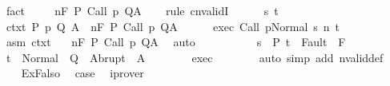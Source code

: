 \begin{isabellebody}
\ fact\isanewline
\ \ \isamarkupfalse%
\ {\isachardoublequoteopen}{\isasymGamma}{\isacharcomma}{\isasymTheta}\ {\isasymTurnstile}n{\isacharcolon}\isactrlbsub {\isacharslash}F\isactrlesub \ P\ {\isacharparenleft}Call\ p{\isacharparenright}\ Q{\isacharcomma}A{\isachardoublequoteclose}\isanewline
\ \ \isamarkupfalse%
\ {\isacharparenleft}rule\ cnvalidI{\isacharparenright}\isanewline
\ \ \ \ \isamarkupfalse%
\ s\ t\isanewline
\ \ \ \ \isamarkupfalse%
\ ctxt{\isacharcolon}\ {\isachardoublequoteopen}{\isasymforall}{\isacharparenleft}P{\isacharcomma}\ p{\isacharcomma}\ Q{\isacharcomma}\ A{\isacharparenright}{\isasymin}{\isasymTheta}{\isachardot}\ {\isasymGamma}\ {\isasymTurnstile}n{\isacharcolon}\isactrlbsub {\isacharslash}F\isactrlesub \ P\ {\isacharparenleft}Call\ p{\isacharparenright}\ Q{\isacharcomma}A{\isachardoublequoteclose}\isanewline
\ \ \ \ \isamarkupfalse%
\ exec{\isacharcolon}\ {\isachardoublequoteopen}{\isasymGamma}{\isasymturnstile}{\isasymlangle}Call\ p{\isacharcomma}Normal\ s{\isasymrangle}\ {\isacharequal}n{\isasymRightarrow}\ t{\isachardoublequoteclose}\isanewline
\ \ \ \ \isamarkupfalse%
\ asm\ ctxt\ \isamarkupfalse%
\ {\isachardoublequoteopen}{\isasymGamma}\ {\isasymTurnstile}n{\isacharcolon}\isactrlbsub {\isacharslash}F\isactrlesub \ P\ Call\ p\ Q{\isacharcomma}A{\isachardoublequoteclose}\ \isamarkupfalse%
\ auto\isanewline
\ \ \ \ \isamarkupfalse%
\isanewline
\ \ \ \ \isamarkupfalse%
\ {\isachardoublequoteopen}s\ {\isasymin}\ P{\isachardoublequoteclose}\ {\isachardoublequoteopen}t\ {\isasymnotin}\ Fault\ {\isacharbackquote}\ F{\isachardoublequoteclose}\isanewline
\ \ \ \ \isamarkupfalse%
\isanewline
\ \ \ \ \isamarkupfalse%
\ {\isachardoublequoteopen}t\ {\isasymin}\ Normal\ {\isacharbackquote}\ Q\ {\isasymunion}\ Abrupt\ {\isacharbackquote}\ A{\isachardoublequoteclose}\isanewline
\ \ \ \ \ \ \isamarkupfalse%
\ exec\isanewline
\ \ \ \ \ \ \isamarkupfalse%
\ {\isacharparenleft}auto\ simp\ add{\isacharcolon}\ nvalid{\isacharunderscore}def{\isacharparenright}\isanewline
\ \ \isamarkupfalse%
\isanewline
{}\isamarkupfalse%
\isanewline
\ \ \isamarkupfalse%
\ ExFalso\ \isamarkupfalse%
\ {\isacharquery}case\ \isamarkupfalse%
\ iprover\isanewline
{}\isamarkupfalse%
%
\endisatagproof
{\isafoldproof}%
%
\isadelimproof

\end{isabellebody}
